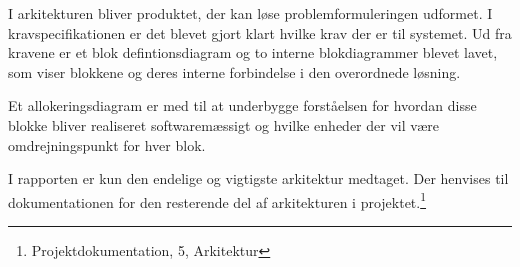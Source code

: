 
I arkitekturen bliver produktet, der kan løse problemformuleringen udformet. I kravspecifikationen er det blevet gjort klart hvilke krav der er til systemet. Ud fra kravene er et blok defintionsdiagram og to interne blokdiagrammer blevet lavet, som viser blokkene og deres interne forbindelse i den overordnede løsning.

Et allokeringsdiagram er med til at underbygge forståelsen for hvordan disse blokke bliver realiseret softwaremæssigt og hvilke enheder der vil være omdrejningspunkt for hver blok.

I rapporten er kun den endelige og vigtigste arkitektur medtaget. Der henvises til dokumentationen for den resterende del af arkitekturen i projektet.\footnote{Projektdokumentation, 5, Arkitektur}